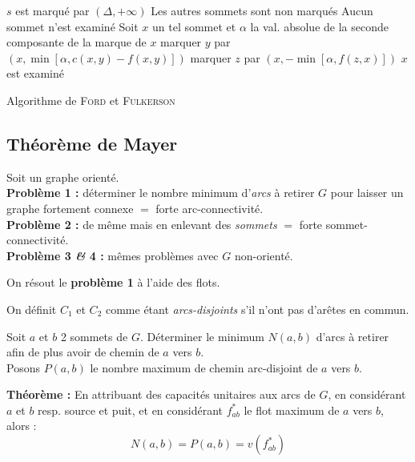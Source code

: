 \documentclass[a4paper, 8pt]{article}
\begin{document}
\begin{multicols*}{3}
\begin{center}
\begin{tikzpicture}[scale = 1.5]
\end{tikzpicture}
\end{center}

\begin{algorithm}[H]
 $s$ est marqué par $(\Delta,+\infty)$ \;
 Les autres sommets sont non marqués \;
 Aucun sommet n'est examiné \;
 {
 	 Soit $x$ un tel sommet et $\alpha$ la val. absolue de la seconde composante de la marque de $x$ \;
 	 {
 	 	{
 	 		marquer $y$ par \footnotesize{$\left(x,\min\left[\alpha,c(x,y)-f(x,y)\right]\right)$} \;
 	 	}
 	 }
 	 {
 	 	{
 	 		marquer $z$ par \footnotesize{$\left(x,-\min\left[\alpha,f(z,x)\right]\right)$} \;
 	 	}
 	 }
 	 $x$ est examiné \;
 }
 
 \caption{Algorithme de \textsc{Ford} et \textsc{Fulkerson}}
\end{algorithm}

\subsection*{Théorème de Mayer}
Soit \GXA un graphe orienté.\\
\textbf{Problème 1 :} déterminer le nombre minimum d'\textit{arcs} à retirer $G$ pour laisser un graphe fortement connexe $=$ forte arc-connectivité.\\
\textbf{Problème 2 :} de même mais en enlevant des \textit{sommets} $=$ forte sommet-connectivité.\\
\textbf{Problème 3 \textit{\&} 4 :} mêmes problèmes avec $G$ non-orienté.

On résout le \textbf{problème 1} à l'aide des flots.

On définit $C_1$ et $C_2$ comme étant \emph{arcs-disjoints} s'il n'ont pas d'arêtes en commun.

\underline{} Soit $a$ et $b$ 2 sommets de $G$. Déterminer le minimum $N(a,b)$ d'arcs à retirer afin de plus avoir de chemin de $a$ vers $b$.\\
Posons $P(a,b)$ le nombre maximum de chemin arc-disjoint de $a$ vers $b$.

\smallskip
\textbf{Théorème :} En attribuant des capacités unitaires aux arcs de $G$, en considérant $a$ et $b$ resp. source et puit, et en considérant $f^*_{ab}$ le flot maximum de $a$ vers $b$, alors :
\[ N(a,b) = P(a,b) = v(f^*_{ab}) \]


\end{multicols*}
\end{document}

